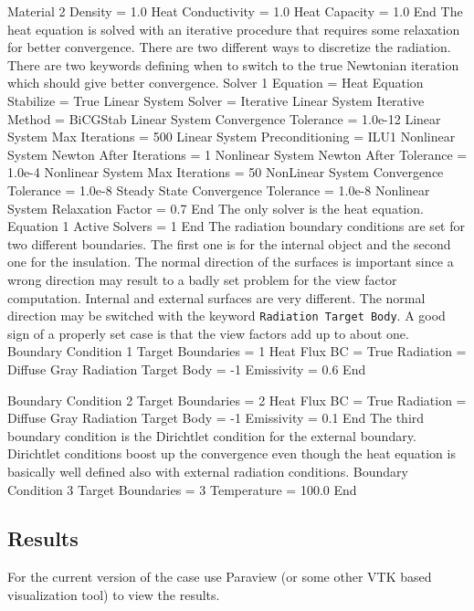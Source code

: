 Material 2
   Density = 1.0
   Heat Conductivity = 1.0
   Heat Capacity = 1.0
End
\ttend
The heat equation is solved with an iterative procedure that requires some relaxation 
for better convergence. There are two different ways to discretize the radiation. 
There are two keywords defining when to switch to the true Newtonian iteration
which should give better convergence.
\ttbegin
Solver 1
  Equation = Heat Equation
  Stabilize = True
  Linear System Solver = Iterative
  Linear System Iterative Method = BiCGStab
  Linear System Convergence Tolerance = 1.0e-12
  Linear System Max Iterations = 500
  Linear System Preconditioning = ILU1
  Nonlinear System Newton After Iterations = 1
  Nonlinear System Newton After Tolerance = 1.0e-4
  Nonlinear System Max Iterations = 50
  NonLinear System Convergence Tolerance = 1.0e-8
  Steady State Convergence Tolerance = 1.0e-8
  Nonlinear System Relaxation Factor = 0.7
End
\ttend
The only solver is the heat equation.
\ttbegin
Equation 1
  Active Solvers = 1
End
\ttend
%
The radiation boundary conditions are set for two different boundaries. The first one
is for the internal object and the second one for the insulation. The normal direction
of the surfaces is important since a wrong direction may result to a badly set problem for
the view factor computation. Internal and external surfaces are very different.
The normal direction may be switched with the keyword \texttt{Radiation Target Body}.
A good sign of a properly set case is that the view factors add up to about one.
\ttbegin
Boundary Condition 1
   Target Boundaries = 1
   Heat Flux BC = True
   Radiation = Diffuse Gray
   Radiation Target Body = -1
   Emissivity = 0.6
End

Boundary Condition 2
   Target Boundaries = 2
   Heat Flux BC = True
   Radiation = Diffuse Gray
   Radiation Target Body = -1
   Emissivity = 0.1
End
\ttend
%
The third boundary condition is the Dirichtlet condition for the external boundary.
Dirichtlet conditions boost up the convergence even though the heat equation is basically
well defined also with external radiation conditions.
\ttbegin
Boundary Condition 3
   Target Boundaries = 3
   Temperature = 100.0
End
\ttend


\subsection*{Results}

For the current version of the case use Paraview (or some other
VTK based visualization tool) to view the results. 

